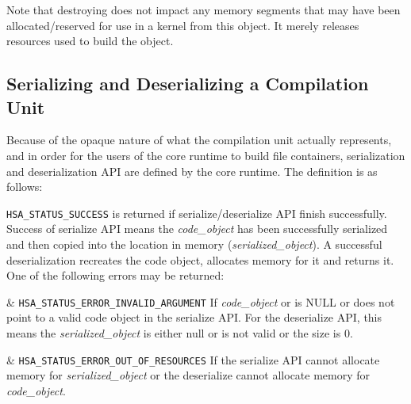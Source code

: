 Note that destroying does not impact any memory segments that may
have been allocated/reserved for use in a kernel from this object.
It merely releases resources used to build the object. 

\subsection{Serializing and Deserializing a Compilation Unit}

Because of the opaque nature of what the compilation unit actually
represents, and in order for the users of the core runtime to build
file containers, serialization and deserialization API are defined
by the core runtime. The definition is as follows:



\texttt{HSA\_STATUS\_SUCCESS} is returned if serialize/deserialize
API finish successfully. Success of serialize API means the
{\itshape code\_object} has been successfully serialized and then
copied into the location in memory ({\itshape serialized\_object}).
A successful deserialization recreates the code object, allocates
memory for it and returns it. One of the following errors may be
returned:
\begin{easylist}
& \texttt{HSA\_STATUS\_ERROR\_INVALID\_ARGUMENT} If {\itshape
code\_object} or is NULL or does not point to a valid code object in
the serialize API. For the deserialize API, this means the {\itshape
serialized\_object} is either null or is not valid or the size is 0.

& \texttt{HSA\_STATUS\_ERROR\_OUT\_OF\_RESOURCES} If the serialize API
cannot allocate memory for {\itshape serialized\_object} or the
deserialize cannot allocate memory for {\itshape code\_object}.
\end{easylist}


